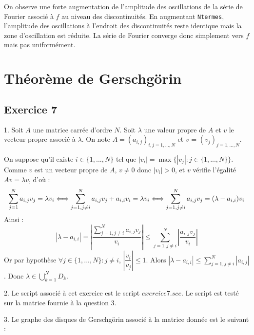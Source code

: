 \documentclass[a4paper,11pt]{article}
\begin{document}
	On observe une forte augmentation de l'amplitude des oscillations de la série de Fourier associé à $f$ au niveau des discontinuités. En augmentant {\tt Ntermes}, l'amplitude des oscillations à l'endroit des discontinuités reste identique mais la zone d'oscillation est réduite. La série de Fourier converge donc simplement vers $f$ mais pas uniformément.


\section{Théorème de Gerschgörin}

\subsection*{Exercice 7}

	1. Soit $A$ une matrice carrée d'ordre $N$. Soit $\lambda$ une valeur propre de $A$ et $v$ le vecteur propre associé à $\lambda$. On note $A = (a_{i,j})_{i,j=1,...,N}$ et $v$ = $(v_{j})_{j=1,...,N}$.

	On suppose qu'il existe $i \in \{1, ..., N\}$ tel que $|v_{i}| = \max \{ |v_{j}| : j \in \{1, ..., N\}\}$. Comme $v$ est un vecteur propre de $A$, $v \neq 0$ donc $|v_{i}| > 0$, et $v$ vérifie l'égalité $Av = \lambda v$, d'où :
	\begin{equation*}
		\sum_{j = 1}^{N} a_{i, j} v_{j} = \lambda v_{i}
		\Longleftrightarrow \sum_{j = 1, j \neq i}^{N} a_{i, j} v_{j} + a_{i, i} v_{i}= \lambda v_{i} \\
		\Longleftrightarrow \sum_{j = 1, j \neq i}^{N} a_{i, j} v_{j} = (\lambda - a_{i, i}) v_{i}
	\end{equation*}
	Ainsi :
	\begin{equation*}
		|\lambda - a_{i, i}| = \left|\frac{\sum\limits_{j = 1, j \neq i}^{N} a_{i, j} v_{j}}{v_{i}} \right|
		\leqslant \sum_{j = 1, j \neq i}^{N} \left|\frac{a_{i, j} v_{j}}{v_{i}} \right|
	\end{equation*}
	Or par hypothèse $\forall j \in \{1, ..., N\} : j \neq i$, $\left|\dfrac{v_{i}}{v_{j}}\right| \leqslant 1$.
	Alors $|\lambda - a_{i, i}| \leqslant \sum\limits_{j = 1, j \neq i}^{N} |a_{i, j}|$. \newline
	Donc $\lambda \in \bigcup\limits_{k=1}^{N} D_{k}$.
	
	2. Le script associé à cet exercice est le script $exercice7.sce$. Le script est testé sur la matrice fournie à la question 3.
	
	3. Le graphe des disques de Gerschgörin associé à la matrice donnée est le suivant :
	
\end{document}
